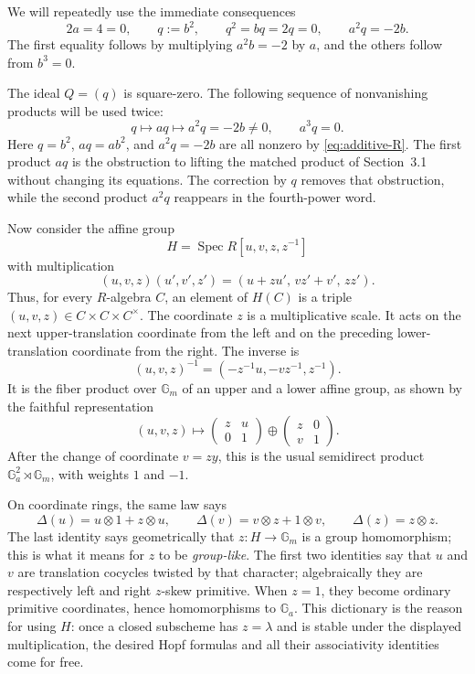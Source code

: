 \documentclass[11pt]{amsart}
\theoremstyle{remark}
\newcommand{\Ga}{\mathbb G_a}
\newcommand{\Gm}{\mathbb G_m}
\newcommand{\Spec}{\operatorname{Spec}}
\newcommand{\ot}{\otimes}
\begin{document}
We will repeatedly use the immediate consequences
\begin{equation}\label{eq:base-identities}
 2a=4=0,\qquad
 q:=b^2,\qquad
 q^2=bq=2q=0,\qquad
 a^2q=-2b.
\end{equation}
The first equality follows by multiplying \(a^2b=-2\) by \(a\), and the
others follow from \(b^3=0\).

The ideal \(Q=(q)\) is square-zero.  The following sequence of
nonvanishing products will be used twice:
\begin{equation}\label{eq:coefficient-chain}
 q\longmapsto aq\longmapsto a^2q=-2b\ne0,
 \qquad a^3q=0.
\end{equation}
Here \(q=b^2\), \(aq=ab^2\), and \(a^2q=-2b\) are all nonzero by
\eqref{eq:additive-R}.
The first product \(aq\) is the obstruction to lifting the matched
product of Section~3.1 without changing its equations.  The correction
by \(q\) removes that obstruction, while the second product \(a^2q\)
reappears in the fourth-power word.

Now consider the affine group
\begin{equation}\label{eq:H}
 H=\Spec R[u,v,z,z^{-1}]
\end{equation}
with multiplication
\begin{equation}\label{eq:H-law}
 (u,v,z)(u',v',z')
   =(u+zu',\,vz'+v',\,zz').
\end{equation}
Thus, for every \(R\)-algebra \(C\), an element of \(H(C)\) is a triple
\((u,v,z)\in C\times C\times C^\times\).  The coordinate \(z\) is a
multiplicative scale.  It acts on the next upper-translation coordinate
from the left and on the preceding lower-translation coordinate from
the right.  The inverse is
\[
 (u,v,z)^{-1}=(-z^{-1}u,-vz^{-1},z^{-1}).
\]
It is the fiber product over \(\Gm\) of an upper and a lower affine
group, as shown by the faithful representation
\begin{equation}\label{eq:H-matrix}
 (u,v,z)\longmapsto
 \begin{pmatrix}z&u\\0&1\end{pmatrix}
 \oplus
 \begin{pmatrix}z&0\\v&1\end{pmatrix}.
\end{equation}
After the change of coordinate \(v=zy\), this is the usual semidirect
product \(\Ga^2\rtimes\Gm\), with weights \(1\) and \(-1\).

On coordinate rings, the same law says
\[
 \Delta(u)=u\ot1+z\ot u,\qquad
 \Delta(v)=v\ot z+1\ot v,\qquad
 \Delta(z)=z\ot z.
\]
The last identity says geometrically that \(z:H\to\Gm\) is a group
homomorphism; this is what it means for \(z\) to be \emph{group-like}.
The first two identities say that \(u\) and \(v\) are translation
cocycles twisted by that character; algebraically they are respectively
left and right \(z\)-skew primitive.  When \(z=1\), they become ordinary
primitive coordinates, hence homomorphisms to \(\Ga\).  This dictionary
is the reason for using \(H\): once a closed subscheme has \(z=\lambda\)
and is stable under the displayed multiplication, the desired Hopf
formulas and all their associativity identities come for free.
\end{document}
